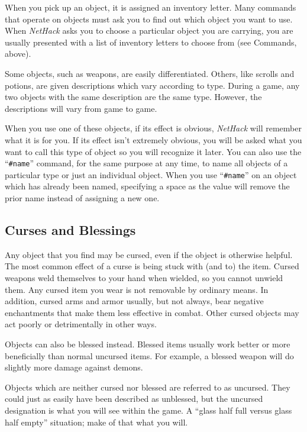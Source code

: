 \documentclass[titlepage]{article}
\begin{document}
When you pick up an object, it is assigned an inventory letter.  Many
commands that operate on objects must ask you to find out which object
you want to use.  When \textit{NetHack} asks you to choose a particular object
you are carrying, you are usually presented with a list of inventory
letters to choose from (see Commands, above).

Some objects, such as weapons, are easily differentiated.  Others, like
scrolls and potions, are given descriptions which vary according to
type.  During a game, any two objects with the same description are
the same type.  However, the descriptions will vary from game to game.

When you use one of these objects, if its effect is obvious, \textit{NetHack}
will remember what it is for you.  If its effect isn't extremely
obvious, you will be asked what you want to call this type of object
so you will recognize it later.  You can also use the ``\texttt{\#name}''
command, for the same purpose at any time, to name
all objects of a particular type or just an individual object.
When you use ``\texttt{\#name}'' on an object which has already been named,
specifying a space as the value will remove the prior name instead
of assigning a new one.

\subsection*{Curses and Blessings}

Any object that you find may be cursed, even if the object is
otherwise helpful.  The most common effect of a curse is being stuck
with (and to) the item.  Cursed weapons weld themselves to your hand
when wielded, so you cannot unwield them.  Any cursed item you wear
is not removable by ordinary means.  In addition, cursed arms and armor
usually, but not always, bear negative enchantments that make them
less effective in combat.  Other cursed objects may act poorly or
detrimentally in other ways.

Objects can also be blessed instead.
Blessed items usually work better or more beneficially than normal
uncursed items.
For example, a blessed weapon will do slightly more damage against demons.

Objects which are neither cursed nor blessed are referred to as uncursed.
They could just as easily have been described as unblessed, but the
uncursed designation is what you will see within the game.  A ``glass
half full versus glass half empty'' situation; make of that what you will.
\end{document}
